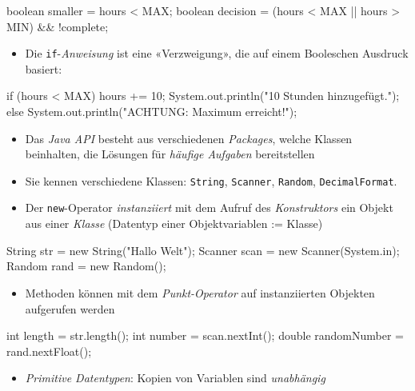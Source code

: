 \documentclass[a4paper,10pt, dvipsnames]{report}
\begin{document}
\begin{javacodebox}
boolean smaller = hours < MAX;
boolean decision = (hours < MAX || hours > MIN) && !complete;
\end{javacodebox}

\begin{itemize}
	\item Die \texttt{if}-\textit{Anweisung} ist eine «Verzweigung», die auf einem Booleschen Ausdruck basiert:
\end{itemize}

\begin{javacodebox}
if (hours < MAX) {
    hours += 10;
    System.out.println("10 Stunden hinzugefügt.");
    } else
    System.out.println("ACHTUNG: Maximum erreicht!");
\end{javacodebox}

\begin{itemize}
    \item Das \textit{Java API} besteht aus verschiedenen \textit{Packages}, welche Klassen beinhalten, die Lösungen für \textit{häufige Aufgaben} bereitstellen
    \item Sie kennen verschiedene Klassen: \texttt{String}, \texttt{Scanner}, \texttt{Random}, \texttt{DecimalFormat}.
    \item Der \texttt{new}-Operator \textit{instanziiert} mit dem Aufruf des \textit{Konstruktors} ein Objekt aus einer \textit{Klasse} (Datentyp einer Objektvariablen := Klasse)
\end{itemize}

\begin{javacodebox}
String str = new String("Hallo Welt");
Scanner scan = new Scanner(System.in);
Random rand = new Random();
\end{javacodebox}

\begin{itemize}
    \item Methoden können mit dem \textit{Punkt-Operator} auf instanziierten Objekten aufgerufen werden
\end{itemize}

\begin{javacodebox}
int length = str.length();
int number = scan.nextInt();
double randomNumber = rand.nextFloat();
\end{javacodebox}

\begin{itemize}
    \item \textit{Primitive Datentypen}: Kopien von Variablen sind \textit{unabhängig}
\end{itemize}
\end{document}
